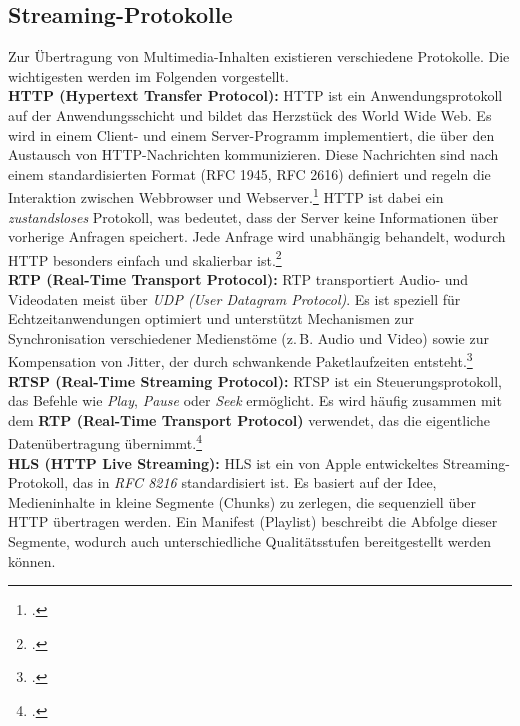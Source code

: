 \documentclass[12pt,a4paper]{report}
\begin{document}
  \subsection{Streaming-Protokolle} 
  Zur Übertragung von Multimedia-Inhalten existieren verschiedene Protokolle. 
  Die wichtigesten werden im Folgenden vorgestellt.  
  \\
  \newline
  \textbf{HTTP (Hypertext Transfer Protocol):}
  HTTP ist ein Anwendungsprotokoll auf der Anwendungsschicht und bildet das Herzstück des World Wide Web. 
  Es wird in einem Client- und einem Server-Programm implementiert, die über den Austausch von HTTP-Nachrichten kommunizieren. 
  Diese Nachrichten sind nach einem standardisierten Format (RFC 1945, RFC 2616) definiert und regeln die Interaktion zwischen Webbrowser und Webserver.\footcite[Vgl.][S.~126]{kurose_networking} 
  HTTP ist dabei ein \emph{zustandsloses} Protokoll, was bedeutet, dass der Server keine Informationen über vorherige Anfragen speichert. 
  Jede Anfrage wird unabhängig behandelt, wodurch HTTP besonders einfach und skalierbar ist.\footcite[Vgl.][S.~128]{kurose_networking}   
  \\
  \newline
  \textbf{RTP (Real-Time Transport Protocol):}  
  RTP transportiert Audio- und Videodaten meist über \emph{UDP (User Datagram Protocol)}. 
  Es ist speziell für Echtzeitanwendungen optimiert und unterstützt Mechanismen zur 
  Synchronisation verschiedener Medienstöme (z.\,B. Audio und Video) 
  sowie zur Kompensation von Jitter, der durch schwankende Paketlaufzeiten entsteht.\footcite[Vgl.][S.~546~ff.]{tanenbaum_computernetworks}   
  \\
  \newline
  \textbf{RTSP (Real-Time Streaming Protocol):}  
  RTSP ist ein Steuerungsprotokoll, das Befehle wie \emph{Play}, \emph{Pause} oder \emph{Seek} ermöglicht. 
  Es wird häufig zusammen mit dem \textbf{RTP (Real-Time Transport Protocol)} verwendet, 
  das die eigentliche Datenübertragung übernimmt.\footcite[Vgl.][S.~638~f.]{kurose_networking}  
  \\
  \newline
  \textbf{HLS (HTTP Live Streaming):}
  HLS ist ein von Apple entwickeltes Streaming-Protokoll, das in \emph{RFC 8216} standardisiert ist.
  Es basiert auf der Idee, Medieninhalte in kleine Segmente (Chunks) zu zerlegen, die sequenziell über HTTP übertragen werden.
  Ein Manifest (Playlist) beschreibt die Abfolge dieser Segmente, wodurch auch unterschiedliche Qualitätsstufen bereitgestellt werden können.
\end{document}
